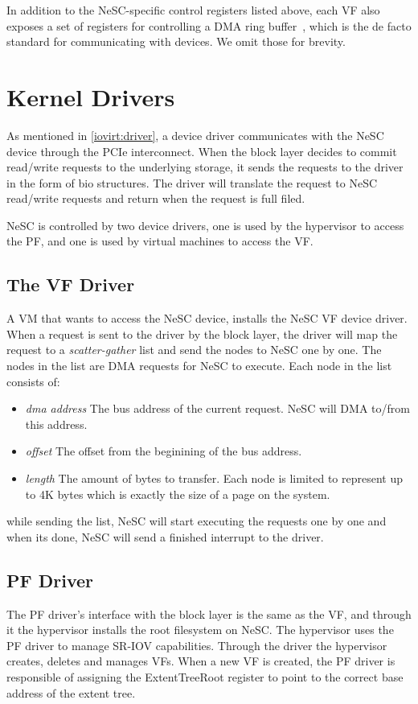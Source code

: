 In addition to the NeSC-specific control registers listed above, each VF also exposes a set of registers for controlling a DMA ring buffer~\cite{love10lkd}, which is the de facto standard for communicating with devices. We omit those for brevity.


\section{Kernel Drivers}
\label{arch:drivers}
As mentioned in \ref{iovirt:driver}, a device driver communicates with the NeSC device through the PCIe interconnect.
When the block layer decides to commit read/write requests to the underlying storage, it sends the requests to
the driver in the form of bio structures. The driver will translate the request to NeSC read/write requests and
return when the request is full filed.

NeSC is controlled by two device drivers, one is used by the hypervisor to access the PF, and one is used by
virtual machines to access the VF. 

\subsection*{The VF Driver}
\label{arch:vfdriver}
A VM that wants to access the NeSC device, installs the NeSC VF device driver.
When a request is sent to the driver by the block layer, the driver will map the request to a
\emph{scatter-gather} list and send the nodes to NeSC one by one. The nodes in the list are DMA requests for NeSC to execute. Each node in the list consists of:
\begin{itemize}
\item \emph{dma address}\quad
  The bus address of the current request. NeSC will DMA to/from this address.  
\item \emph{offset} \quad
  The offset from the beginining of the bus address.
\item \emph{length} \quad
  The amount of bytes to transfer. Each node is limited to represent up to 4K bytes which is exactly the size of
  a page on the system.
\end{itemize}

while sending the list, NeSC will start executing the requests one by one and when its done, NeSC will send a finished interrupt to the driver.

\subsection*{PF Driver}
\label{arch:pfdriver}
The PF driver's interface with the block layer is the same as the VF, and through it the hypervisor installs the root filesystem on NeSC.
The hypervisor uses the PF driver to manage SR-IOV capabilities. Through the driver the hypervisor creates, deletes and manages VFs. When a new VF is created, the PF driver is responsible of assigning the ExtentTreeRoot register to point to the correct base address of the extent tree.

